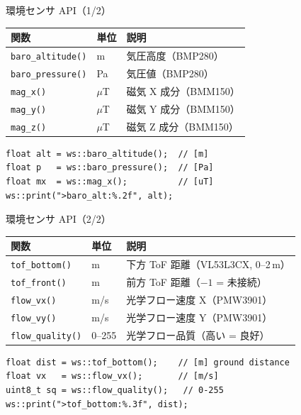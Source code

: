 \begin{frame}[fragile]{環境センサ API（1/2）}
  {\small
  \begin{tabular}{lll}
    \hline
    \textbf{関数} & \textbf{単位} & \textbf{説明} \\
    \hline
    \texttt{baro\_altitude()} & m   & 気圧高度（BMP280） \\
    \texttt{baro\_pressure()} & Pa  & 気圧値（BMP280） \\
    \texttt{mag\_x()}         & $\mu$T & 磁気 X 成分（BMM150） \\
    \texttt{mag\_y()}         & $\mu$T & 磁気 Y 成分（BMM150） \\
    \texttt{mag\_z()}         & $\mu$T & 磁気 Z 成分（BMM150） \\
    \hline
  \end{tabular}
  }

  \vspace{0.3em}

  \begin{lstlisting}[style=sfcpp, basicstyle=\ttfamily\scriptsize]
float alt = ws::baro_altitude();  // [m]
float p   = ws::baro_pressure();  // [Pa]
float mx  = ws::mag_x();          // [uT]
ws::print(">baro_alt:%.2f", alt);
  \end{lstlisting}
\end{frame}

\begin{frame}[fragile]{環境センサ API（2/2）}
  {\small
  \begin{tabular}{lll}
    \hline
    \textbf{関数} & \textbf{単位} & \textbf{説明} \\
    \hline
    \texttt{tof\_bottom()}   & m     & 下方 ToF 距離（VL53L3CX, 0--2\,m） \\
    \texttt{tof\_front()}    & m     & 前方 ToF 距離（$-1$ = 未接続） \\
    \texttt{flow\_vx()}      & m/s   & 光学フロー速度 X（PMW3901） \\
    \texttt{flow\_vy()}      & m/s   & 光学フロー速度 Y（PMW3901） \\
    \texttt{flow\_quality()} & 0--255 & 光学フロー品質（高い = 良好） \\
    \hline
  \end{tabular}
  }

  \vspace{0.3em}

  \begin{lstlisting}[style=sfcpp, basicstyle=\ttfamily\scriptsize]
float dist = ws::tof_bottom();    // [m] ground distance
float vx   = ws::flow_vx();       // [m/s]
uint8_t sq = ws::flow_quality();   // 0-255
ws::print(">tof_bottom:%.3f", dist);
  \end{lstlisting}
\end{frame}

